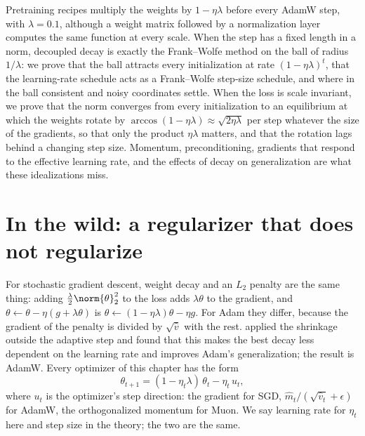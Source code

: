 \newcommand{\decayball}{\mathcal{B}_\lambda}
\newcommand{\decayeff}{\eta_{\mathrm{eff}}}

\begin{refsection}

\begin{chaptersummary}
Pretraining recipes multiply the weights by $1-\eta\lambda$ before every AdamW step, with $\lambda=0.1$, although a weight matrix followed by a normalization layer computes the same function at every scale. When the step has a fixed length in a norm, decoupled decay is exactly the Frank--Wolfe method on the ball of radius $1/\lambda$: we prove that the ball attracts every initialization at rate $(1-\eta\lambda)^t$, that the learning-rate schedule acts as a Frank--Wolfe step-size schedule, and where in the ball consistent and noisy coordinates settle. When the loss is scale invariant, we prove that the norm converges from every initialization to an equilibrium at which the weights rotate by $\arccos(1-\eta\lambda)\approx\sqrt{2\eta\lambda}$ per step whatever the size of the gradients, so that only the product $\eta\lambda$ matters, and that the rotation lags behind a changing step size. Momentum, preconditioning, gradients that respond to the effective learning rate, and the effects of decay on generalization are what these idealizations miss.
\end{chaptersummary}

\section{In the wild: a regularizer that does not regularize}\label{sec:decay:wild}

For stochastic gradient descent, weight decay and an $L_2$ penalty are the same thing: adding $\frac\lambda2\norm{\theta}_2^2$ to the loss adds $\lambda\theta$ to the gradient, and $\theta\leftarrow\theta-\eta(g+\lambda\theta)$ is $\theta\leftarrow(1-\eta\lambda)\theta-\eta g$. For Adam they differ, because the gradient of the penalty is divided by $\sqrt{\hat v}$ with the rest. \Textcite{LoshchilovHutter2019} applied the shrinkage outside the adaptive step and found that this  makes the best decay less dependent on the learning rate and improves Adam's generalization; the result is AdamW. Every optimizer of this chapter has the form
\begin{equation}\label{eq:decay:update}
  \theta_{t+1}=(1-\eta_t\lambda)\,\theta_t-\eta_t\,u_t ,
\end{equation}
where $u_t$ is the optimizer's step direction: the gradient for SGD, $\hat m_t/(\sqrt{\hat v_t}+\epsilon)$ for AdamW, the orthogonalized momentum for Muon. We say learning rate for $\eta_t$ here and step size in the theory; the two are the same.


\end{refsection}
